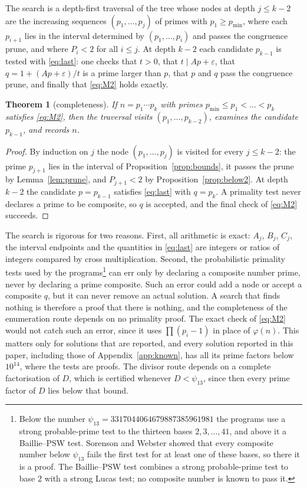 \documentclass[11pt,reqno]{amsart}
\numberwithin{equation}{section}
\theoremstyle{plain}
\newtheorem{theorem}{Theorem}[section]
\theoremstyle{definition}
\theoremstyle{remark}
\begin{document}
The search is a depth-first traversal of the tree whose nodes at depth
$j\le k-2$ are the increasing sequences $(p_1,\dots,p_j)$ of primes
with $p_1\ge p_{\min}$, where each $p_{i+1}$ lies in the interval
determined by $(p_1,\dots,p_i)$ and passes the congruence prune, and
where $P_i<2$ for all $i\le j$. At depth $k-2$ each candidate
$p_{k-1}$ is tested with \eqref{eq:last}: one checks that $t>0$, that
$t\mid Ap+\varepsilon$, that $q=1+(Ap+\varepsilon)/t$ is a prime larger
than $p$, that $p$ and $q$ pass the congruence prune, and finally that
\eqref{eq:M2} holds exactly.

\begin{theorem}[completeness]\label{thm:complete}
If $n=p_1\cdots p_k$ with primes $p_{\min}\le p_1<\dots<p_k$ satisfies
\eqref{eq:M2}, then the traversal visits $(p_1,\dots,p_{k-2})$,
examines the candidate $p_{k-1}$, and records $n$.
\end{theorem}

\begin{proof}
By induction on $j$ the node $(p_1,\dots,p_j)$ is visited for every
$j\le k-2$: the prime $p_{j+1}$ lies in the interval of
Proposition~\ref{prop:bounds}, it passes the prune by
Lemma~\ref{lem:prune}, and $P_{j+1}<2$ by
Proposition~\ref{prop:below2}. At depth $k-2$ the candidate
$p=p_{k-1}$ satisfies \eqref{eq:last} with $q=p_k$. A primality test
never declares a prime to be composite, so $q$ is accepted, and the
final check of \eqref{eq:M2} succeeds.
\end{proof}

The search is rigorous for two reasons. First, all arithmetic is
exact:
$A_j$, $B_j$, $C_j$, the interval endpoints and the quantities in
\eqref{eq:last} are integers or ratios of integers compared by cross
multiplication. Second, the probabilistic primality tests used by the
programs\footnote{Below the number
$\psi_{13}=3317044064679887385961981$ the programs use a strong
probable-prime test to the thirteen bases $2,3,\dots,41$, and above it
a Baillie--PSW test. Sorenson and Webster \cite{SW17} showed that
every composite number below $\psi_{13}$ fails the first test for at
least one of these bases, so there it is a proof. The
Baillie--PSW test \cite{BW80,PSW80} combines a strong probable-prime
test to base $2$ with a strong Lucas test; no composite number is
known to pass it.} can err only by declaring a composite number prime,
never by declaring a prime composite. Such an error could add a node
or accept a composite $q$, but it can never remove an actual solution.
A search that finds nothing is therefore a proof that there is
nothing, and the completeness of the enumeration route depends on no
primality proof. The exact check of \eqref{eq:M2} would not catch such
an error, since it uses $\prod(p_i-1)$ in place of $\varphi(n)$. This
matters only for solutions that are reported, and every solution
reported in this paper, including those of Appendix~\ref{app:known},
has all its prime factors below $10^{14}$, where the tests are
proofs. The divisor route depends on a complete
factorisation of $D$, which is certified whenever $D<\psi_{13}$,
since then every prime factor of $D$ lies below that bound.
\end{document}
